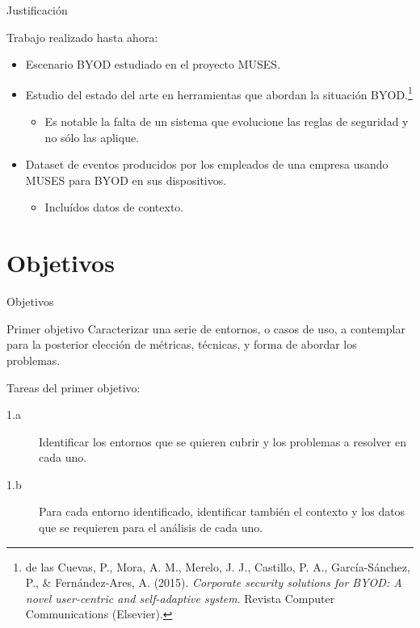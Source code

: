 \documentclass{beamer}
\begin{document}
\begin{frame}{Justificación}

Trabajo realizado hasta ahora:

\begin{itemize}
  \item Escenario BYOD estudiado en el proyecto MUSES.
  \item Estudio del estado del arte en herramientas que abordan la situación BYOD.\footnote{{\scriptsize de las Cuevas, P., Mora, A. M., Merelo, J. J., Castillo, P. A., García-Sánchez, P., \& Fernández-Ares, A. (2015). \textit{Corporate security solutions for BYOD: A novel user-centric and self-adaptive system}. Revista Computer Communications (Elsevier).}}
  \begin{itemize}
    \item Es notable la falta de un sistema que evolucione las reglas de seguridad y no sólo las aplique.
  \end{itemize}
  \item Dataset de eventos producidos por los empleados de una empresa usando MUSES para BYOD en sus dispositivos.
  \begin{itemize}
    \item Incluídos datos de contexto.
  \end{itemize}
\end{itemize}

\end{frame}


\section{Objetivos}

\begin{frame}{Objetivos}

\begin{block}{Primer objetivo}
Caracterizar una serie de entornos, o casos de uso, a contemplar para la posterior elección de métricas, técnicas, y forma de abordar los problemas.
\end{block}

Tareas del primer objetivo:

\begin{description}
  \item[1.a] Identificar los entornos que se quieren cubrir y los problemas a resolver en cada uno.
  \item[1.b] Para cada entorno identificado, identificar también el contexto y los datos que se requieren para el análisis de cada uno.
\end{description}

\end{frame}
\end{document}
